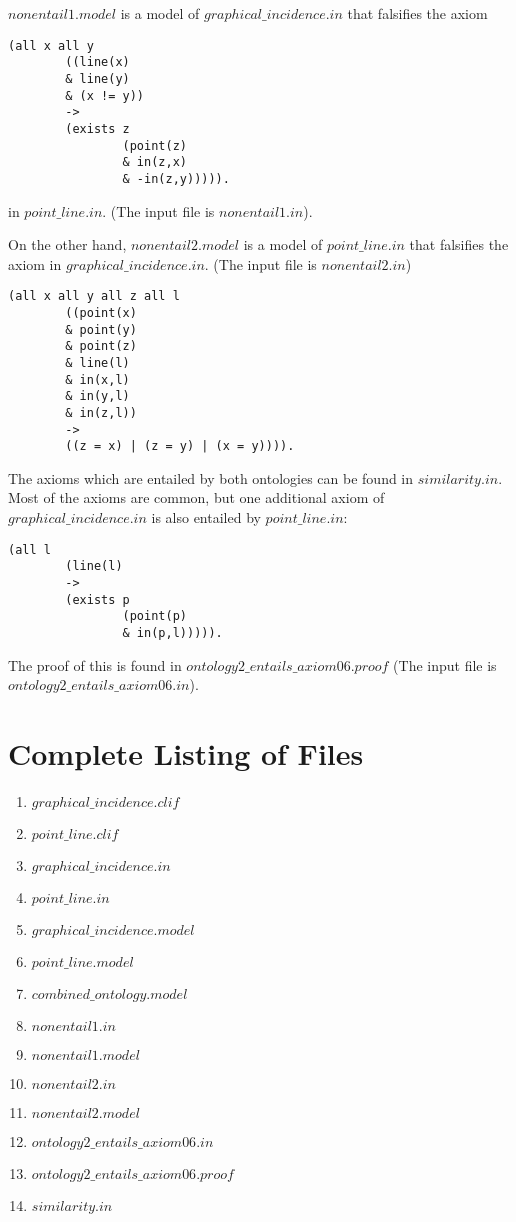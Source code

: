 \documentclass[psamsfonts]{amsart}
\numberwithin{equation}{subsection}
\begin{document}
$nonentail1.model$ is a model of $graphical\_incidence.in$ that falsifies the axiom

\begin{verbatim}
(all x all y
        ((line(x)
        & line(y)
        & (x != y))
        ->
        (exists z
                (point(z)
                & in(z,x)
                & -in(z,y))))).
\end{verbatim}

in $point\_line.in$. (The input file is $nonentail1.in$).

On the other hand, $nonentail2.model$ is a model of $point\_line.in$ that falsifies the axiom
in $graphical\_incidence.in$. (The input file is $nonentail2.in$)

\begin{verbatim}
(all x all y all z all l
        ((point(x)
        & point(y)
        & point(z)
        & line(l)
        & in(x,l)
        & in(y,l)
        & in(z,l))
        ->
        ((z = x) | (z = y) | (x = y)))).
\end{verbatim}

The axioms which are entailed by both ontologies can be found in $similarity.in$.
Most of the axioms are common, but one additional axiom of $graphical\_incidence.in$ is
also entailed by $point\_line.in$:
\begin{verbatim}
(all l
        (line(l)
        ->
        (exists p
                (point(p)
                & in(p,l))))).
\end{verbatim}

The proof of this is found in $ontology2\_entails\_axiom06.proof$ (The input file is $ontology2\_entails\_axiom06.in$).

\section{Complete Listing of Files}

\begin{enumerate}
\item $graphical\_incidence.clif$
\item $point\_line.clif$
\item $graphical\_incidence.in$
\item $point\_line.in$
\item $graphical\_incidence.model$
\item $point\_line.model$
\item $combined\_ontology.model$
\item $nonentail1.in$
\item $nonentail1.model$
\item $nonentail2.in$
\item $nonentail2.model$
\item $ontology2\_entails\_axiom06.in$
\item $ontology2\_entails\_axiom06.proof$
\item $similarity.in$
\end{enumerate}
\end{document}

